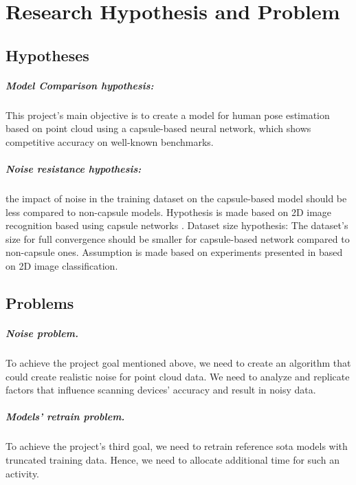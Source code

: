 \chapter{Research Hypothesis and Problem}

\label{Hypothesis}

\section{Hypotheses}
\paragraph{Model Comparison hypothesis:} This project's main objective is to create a model for human pose estimation based on point cloud using a capsule-based neural network, which shows competitive accuracy on well-known benchmarks.

\paragraph{Noise resistance hypothesis:} the impact of noise in the training dataset on the capsule-based model should be less compared to non-capsule models. Hypothesis is made based on 2D image recognition based using capsule networks \cite{sabour_dynamic_2017}.
Dataset size hypothesis: The dataset's size for full convergence should be smaller for capsule-based network compared to non-capsule ones. Assumption is made based on experiments presented in \cite{sabour_dynamic_2017} based on 2D image classification.

\section{Problems}
\paragraph{Noise problem.} To achieve the project goal mentioned above, we need to create an algorithm that could create realistic noise for point cloud data. We need to analyze and replicate factors that influence scanning devices' accuracy and result in noisy data.
\paragraph{Models' retrain problem.} To achieve the project's third goal, we need to retrain reference sota models with truncated training data. Hence, we need to allocate additional time for such an activity.